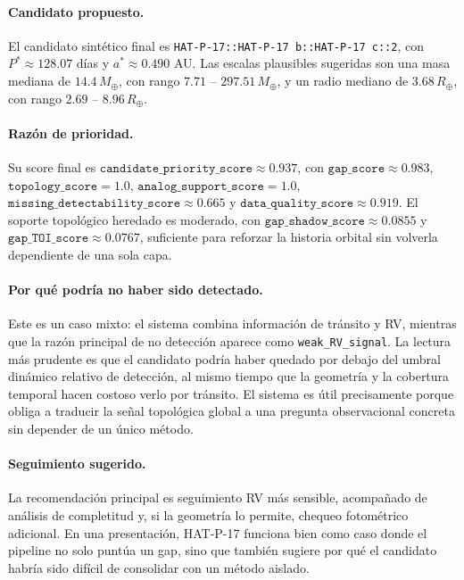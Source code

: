\paragraph{Candidato propuesto.}
El candidato sint\'etico final es \texttt{HAT-P-17::HAT-P-17 b::HAT-P-17 c::2}, con \(P^\ast \approx 128.07\) d\'ias y \(a^\ast \approx 0.490\) AU. Las escalas plausibles sugeridas son una masa mediana de \(14.4\,M_\oplus\), con rango \(7.71\) -- \(297.51\,M_\oplus\), y un radio mediano de \(3.68\,R_\oplus\), con rango \(2.69\) -- \(8.96\,R_\oplus\).

\paragraph{Raz\'on de prioridad.}
Su score final es \(\texttt{candidate\_priority\_score}\approx 0.937\), con \(\texttt{gap\_score}\approx 0.983\), \(\texttt{topology\_score}=1.0\), \(\texttt{analog\_support\_score}=1.0\), \(\texttt{missing\_detectability\_score}\approx 0.665\) y \(\texttt{data\_quality\_score}\approx 0.919\). El soporte topol\'ogico heredado es moderado, con \(\texttt{gap\_shadow\_score}\approx 0.0855\) y \(\texttt{gap\_TOI\_score}\approx 0.0767\), suficiente para reforzar la historia orbital sin volverla dependiente de una sola capa.

\paragraph{Por qu\'e podr\'ia no haber sido detectado.}
Este es un caso mixto: el sistema combina informaci\'on de tr\'ansito y RV, mientras que la raz\'on principal de no detecci\'on aparece como \texttt{weak\_RV\_signal}. La lectura m\'as prudente es que el candidato podr\'ia haber quedado por debajo del umbral din\'amico relativo de detecci\'on, al mismo tiempo que la geometr\'ia y la cobertura temporal hacen costoso verlo por tr\'ansito. El sistema es \'util precisamente porque obliga a traducir la se\~nal topol\'ogica global a una pregunta observacional concreta sin depender de un \'unico m\'etodo.

\paragraph{Seguimiento sugerido.}
La recomendaci\'on principal es seguimiento RV m\'as sensible, acompa\~nado de an\'alisis de completitud y, si la geometr\'ia lo permite, chequeo fotom\'etrico adicional. En una presentaci\'on, HAT-P-17 funciona bien como caso donde el pipeline no solo punt\'ua un gap, sino que tambi\'en sugiere por qu\'e el candidato habr\'ia sido dif\'icil de consolidar con un m\'etodo aislado.


